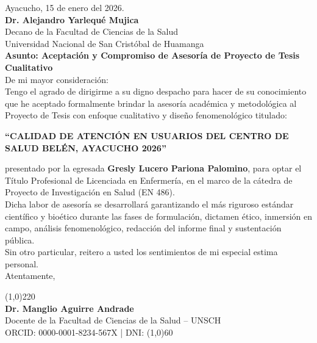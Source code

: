\noindent Ayacucho, 15 de enero del 2026.\\[0.3cm]
\textbf{Dr. Alejandro Yarlequé Mujica}\\
Decano de la Facultad de Ciencias de la Salud\\
Universidad Nacional de San Cristóbal de Huamanga\\[0.3cm]
\textbf{Asunto: Aceptación y Compromiso de Asesoría de Proyecto de Tesis Cualitativo}\\[0.3cm]
De mi mayor consideración:\\[0.2cm]
Tengo el agrado de dirigirme a su digno despacho para hacer de su conocimiento que he aceptado formalmente brindar la asesoría académica y metodológica al Proyecto de Tesis con enfoque cualitativo y diseño fenomenológico titulado:
\begin{center}
\textbf{``CALIDAD DE ATENCIÓN EN USUARIOS DEL CENTRO DE SALUD BELÉN, AYACUCHO 2026''}
\end{center}
presentado por la egresada \textbf{Gresly Lucero Pariona Palomino}, para optar el Título Profesional de Licenciada en Enfermería, en el marco de la cátedra de Proyecto de Investigación en Salud (EN 486).\\[0.2cm]
Dicha labor de asesoría se desarrollará garantizando el más riguroso estándar científico y bioético durante las fases de formulación, dictamen ético, inmersión en campo, análisis fenomenológico, redacción del informe final y sustentación pública.\\[0.2cm]
Sin otro particular, reitero a usted los sentimientos de mi especial estima personal.\\[0.3cm]
Atentamente,\\[1.2cm]
\begin{center}
    \line(1,0){220}\\
    \textbf{Dr. Manglio Aguirre Andrade}\\
    Docente de la Facultad de Ciencias de la Salud -- UNSCH\\
    ORCID: 0000-0001-8234-567X \quad | \quad DNI: \line(1,0){60}
\end{center}
